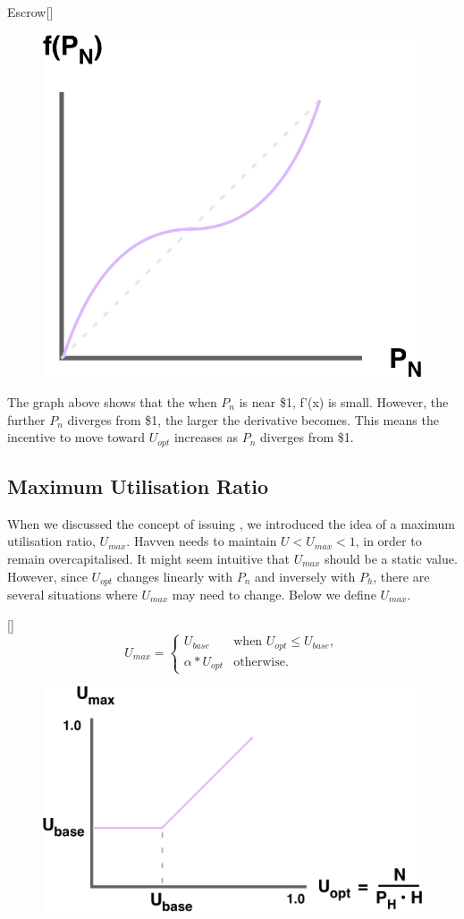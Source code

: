 \begin{namedthm*}{Escrow}[]
\begin{figure}[h!]
    \centering
    \includegraphics[width=.5\textwidth]{img/U_opt}
\end{figure}

\noindent The graph above shows that the when $P_n$ is near \$1, f'(x) is small. However, the further $P_n$ diverges from \$1, the larger the derivative becomes. This means the incentive to move toward $U_{opt}$ increases as $P_n$ diverges from \$1.

\newpage

\subsection*{Maximum Utilisation Ratio}

\noindent When we discussed the concept of issuing \NOM{}, we introduced the idea of a maximum utilisation ratio, $U_{max}$. Havven needs to maintain $U < U_{max} < 1$, in order to remain overcapitalised. It might seem intuitive that $U_{max}$ should be a static value. However, since $U_{opt}$ changes linearly with $P_n$ and inversely with $P_h$, there are several situations where $U_{max}$ may need to change. Below we define $U_{max}$.

\begin{namedthm}{}[]
\[
U_{max} = 
\begin{cases}
 U_{base} &\mbox{when } U_{opt} \leq U_{base}, \\ 
 \alpha * U_{opt} &\mbox{otherwise}.
 \end{cases}
\]
\end{namedthm}

\begin{figure}[h!]
    \centering
    \includegraphics[width=.75\textwidth]{img/U_max}
\end{figure}


\end{namedthm*}
